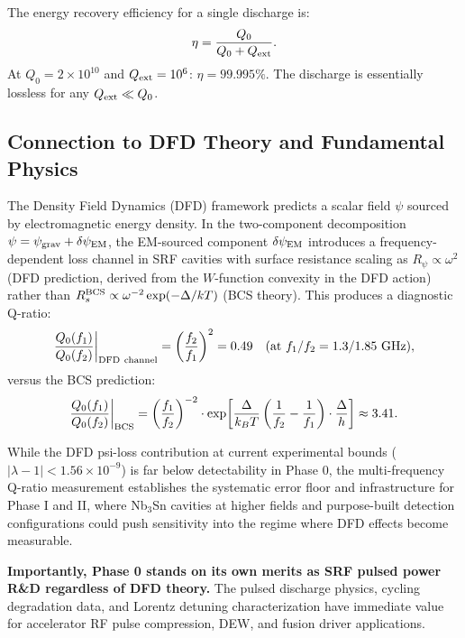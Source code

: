 \documentclass[11pt]{article}
\newcommand{\ee}[1]{\times 10^{#1}}
\newcommand{\psigrav}{\psi_{\rm grav}}
\newcommand{\dpsiEM}{\delta\psi_{\rm EM}}
\newcommand{\Qext}{Q_{\rm ext}}
\newcommand{\Qzero}{Q_0}
\begin{document}
The energy recovery efficiency for a single discharge is:
\begin{equation}
\eta = \frac{\Qzero}{\Qzero + \Qext}.
\label{eq:efficiency}
\end{equation}
At $\Qzero = 2\ee{10}$ and $\Qext = 10^6$: $\eta = 99.995\%$.
The discharge is essentially lossless for any $\Qext \ll \Qzero$.

\subsection{Connection to DFD Theory and Fundamental Physics}

The Density Field Dynamics (DFD) framework predicts a scalar field
$\psi$ sourced by electromagnetic energy density. In the two-component
decomposition $\psi = \psigrav + \dpsiEM$, the EM-sourced component
$\dpsiEM$ introduces a frequency-dependent loss channel in SRF
cavities with surface resistance scaling as $R_\psi \propto \omega^2$
(DFD prediction, derived from the $W$-function convexity in the DFD
action) rather than $R_s^{\rm BCS} \propto \omega^{-2} \exp(-\Delta/kT)$
(BCS theory). This produces a diagnostic Q-ratio:
\begin{equation}
\frac{\Qzero(f_1)}{\Qzero(f_2)}\bigg|_{\rm DFD~channel}
= \left(\frac{f_2}{f_1}\right)^2 = 0.49
\quad\text{(at $f_1/f_2 = 1.3/1.85$~GHz)},
\label{eq:q-ratio-dfd}
\end{equation}
versus the BCS prediction:
\begin{equation}
\frac{\Qzero(f_1)}{\Qzero(f_2)}\bigg|_{\rm BCS}
= \left(\frac{f_1}{f_2}\right)^{-2} \cdot
\exp\!\left[\frac{\Delta}{k_B T}\left(\frac{1}{f_2}-\frac{1}{f_1}
\right) \cdot \frac{\Delta}{h}\right] \approx 3.41.
\label{eq:q-ratio-bcs}
\end{equation}

While the DFD psi-loss contribution at current experimental bounds
($|\lambda - 1| < 1.56\ee{-9}$) is far below detectability in
Phase 0, the multi-frequency Q-ratio measurement establishes the
systematic error floor and infrastructure for Phase I and II, where
Nb$_3$Sn cavities at higher fields and purpose-built detection
configurations could push sensitivity into the regime where DFD
effects become measurable.

\textbf{Importantly, Phase 0 stands on its own merits as SRF pulsed
power R\&D regardless of DFD theory.} The pulsed discharge physics,
cycling degradation data, and Lorentz detuning characterization have
immediate value for accelerator RF pulse compression, DEW, and fusion
driver applications.
\end{document}
